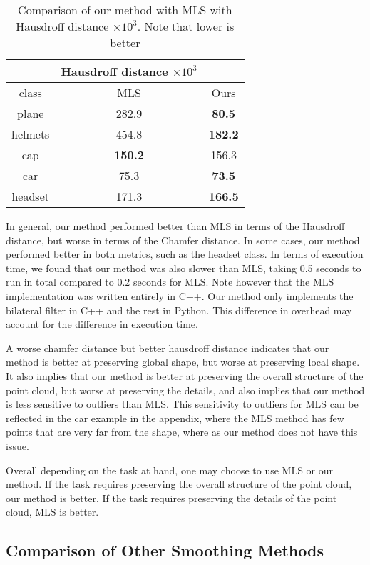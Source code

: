\begin{table}[H]
\centering
\begin{tabular}{ccc}
	& Hausdroff distance $\times 10^3$ &\\
	\hline
	class & MLS & Ours \\
	\hline
	plane & 282.9 & \textbf{80.5} \\ 
helmets & 454.8 &  \textbf{182.2}\\
cap & \textbf{150.2} & 156.3 \\ 
car & 75.3 & \textbf{73.5} \\  
headset & 171.3 & \textbf{166.5} \\
\end{tabular}
\caption{Comparison of our method with MLS with Hausdroff distance $\times 10^3$. Note that lower is better}
\end{table}

In general, our method performed better than MLS in terms of the Hausdroff distance, but worse in terms of the Chamfer distance.
In some cases, our method performed better in both metrics, such as the headset class.
In terms of execution time, we found that our method was also slower than MLS, taking 0.5 seconds to run in total compared to 0.2 seconds for MLS.
Note however that the MLS implementation was written entirely in C++. Our method only implements the bilateral filter in C++ and the rest in Python. 
This difference in overhead may account for the difference in execution time.

A worse chamfer distance but better hausdroff distance indicates that our method is better at preserving global shape, but worse at preserving local shape.
It also implies that our method is better at preserving the overall structure of the point cloud, but worse at preserving the details, and also implies that our method is less sensitive to outliers than MLS.
This sensitivity to outliers for MLS can be reflected in the car example in the appendix, where the MLS method has few points that are very far from the shape, where as our method does not have this issue.

Overall depending on the task at hand, one may choose to use MLS or our method. If the task requires preserving the overall structure of the point cloud, our method is better. If the task requires preserving the details of the point cloud, MLS is better.

\subsection{Comparison of Other Smoothing Methods}

